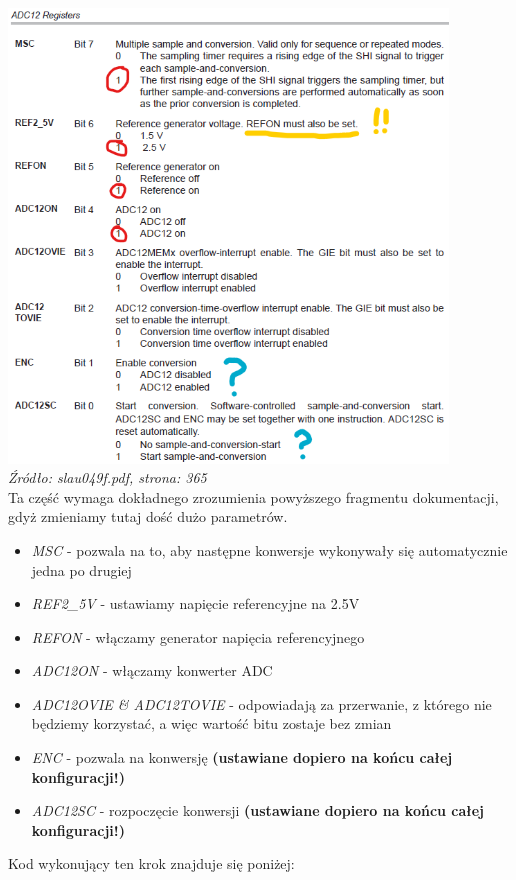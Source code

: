 \documentclass{article}
\begin{document}
\begin{enumerate}[label=\arabic*.]
\includegraphics[width=0.875\textwidth]{"../img/slau049f_365.png"} \\
\textit{Źródło: slau049f.pdf, strona: 365}
\vspace{3mm} \\
Ta część wymaga dokładnego zrozumienia powyższego fragmentu dokumentacji, gdyż zmieniamy tutaj dość dużo parametrów.
\begin{itemize}
     \item \textit{MSC} - pozwala na to, aby następne konwersje wykonywały się automatycznie jedna po drugiej
     \item \textit{REF2\_5V} - ustawiamy napięcie referencyjne na 2.5V
     \item \textit{REFON} - włączamy generator napięcia referencyjnego
     \item \textit{ADC12ON} - włączamy konwerter ADC
     \item \textit{ADC12OVIE \& ADC12TOVIE} - odpowiadają za przerwanie, z którego nie będziemy korzystać, a więc wartość bitu zostaje bez zmian
     \item \textit{ENC} - pozwala na konwersję \textbf{(ustawiane dopiero na końcu całej konfiguracji!)}
     \item \textit{ADC12SC} - rozpoczęcie konwersji \textbf{(ustawiane dopiero na końcu całej konfiguracji!)}
\end{itemize}
Kod wykonujący ten krok znajduje się poniżej:
\begin{verbatim}

\end{verbatim}
\end{enumerate}
\end{document}
